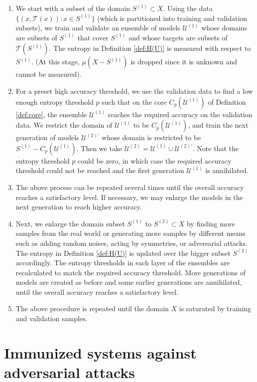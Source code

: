 \documentclass{article}
\theoremstyle{plain}
\theoremstyle{definition}
\theoremstyle{remark}
\newcommand{\cT}{\mathcal{T}}
\newcommand{\cU}{\mathcal{U}}
\begin{document}
\begin{enumerate}
	\item We start with a subset of the domain $S^{(1)}\subset X$. Using the data $\{(x,\cT(x)): x\in S^{(1)}\}$ (which is partitioned into training and validation subsets), we train and validate an ensemble of models $\cU^{(1)}$ whose domains are subsets of $S^{(1)}$ that cover $S^{(1)}$ and whose targets are subsets of $\cT(S^{(1)})$. The entropy in Definition \ref{def:H(U)} is measured with respect to $S^{(1)}$. (At this stage, $\mu(X-S^{(1)})$ is dropped since it is unknown and cannot be measured).
	\item For a preset high accuracy threshold, we use the validation data to find a low enough entropy threshold $p$ such that on the core $C_p(\cU^{(1)})$ of Definition \ref{def:core}, the ensemble $\cU^{(1)}$ reaches the required accuracy on the validation data. We restrict the domain of $\cU^{(1)}$ to be $C_p(\cU^{(1)})$, and train the next generation of models $\cU^{(2)'}$ whose domain is restricted to be $S^{(1)} - C_p(\cU^{(1)})$. Then we take $\cU^{(2)} = \cU^{(1)} \cup \cU^{(2)'}$. Note that the entropy threshold $p$ could be zero, in which case the required accuracy threshold could not be reached and the first generation $\cU^{(1)}$ is annihilated.
	\item The above process can be repeated several times until the overall accuracy reaches a satisfactory level. If necessary, we may enlarge the models in the next generation to reach higher accuracy.
	\item Next, we enlarge the domain subset $S^{(1)}$ to $S^{(2)} \subset X$ by finding more samples from the real world or generating more samples by different means such as adding random noises, acting by symmetries, or adversarial attacks. The entropy in Definition \ref{def:H(U)} is updated over the bigger subset $S^{(2)}$ accordingly. The entropy thresholds in each layer of the ensembles are recalculated to match the required accuracy threshold. More generations of models are created as before and some earlier generations are annihilated, until the overall accuracy reaches a satisfactory level.
	\item The above procedure is repeated until the domain $X$ is saturated by training and validation samples.
\end{enumerate}

\section{Immunized systems against adversarial attacks}
\label{sec:experiments}
\end{document}
